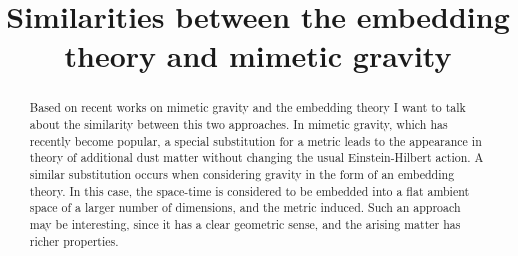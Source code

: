 \documentclass[12pt]{article}
\begin{document}
\title{Similarities between the embedding theory and mimetic gravity}
\date{}
\maketitle
\begin{abstract}
	Based on recent works on mimetic gravity and the embedding theory I want to talk about the similarity between this two approaches. In mimetic gravity, which has recently become popular, a special substitution for a metric leads to the appearance in theory of additional dust matter without changing the usual Einstein-Hilbert action. A similar substitution occurs when considering gravity in the form of an embedding theory. In this case, the space-time is considered to be embedded into a flat ambient space of a larger number of dimensions, and the metric induced. Such an approach may be interesting, since it has a clear geometric sense, and the arising matter has richer properties.
\end{abstract}
\end{document}
